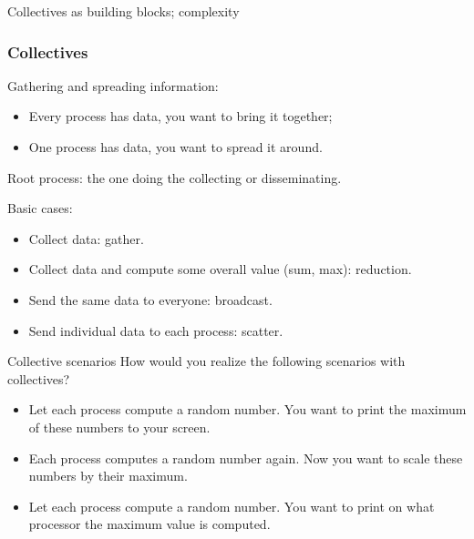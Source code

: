 
 {Collectives as building blocks; complexity}

\begin{frame}[containsverbatim]\frametitle{Collectives}
  Gathering and spreading information:
  \begin{itemize}
  \item Every process has data, you want to bring it together;
  \item One process has data, you want to spread it around.
  \end{itemize}
  Root process: the one doing the collecting or disseminating.

  Basic cases:
  \begin{itemize}
  \item Collect data: gather.
  \item Collect data and compute some overall value (sum, max): reduction.
  \item Send the same data to everyone: broadcast.
  \item Send individual data to each process: scatter.
  \end{itemize}
\end{frame}


\begin{frame}{Collective scenarios}
  How would you realize the following scenarios with collectives?
  \begin{itemize}
  \item Let each process compute a random number. You want to print the
    maximum of these numbers to your screen.
  \item Each process computes a random number again. Now you want to
    scale these numbers by their maximum. 
  \item Let each process compute a random number. You want to print on what processor the
    maximum value is computed. 
  \end{itemize}
\end{frame}

